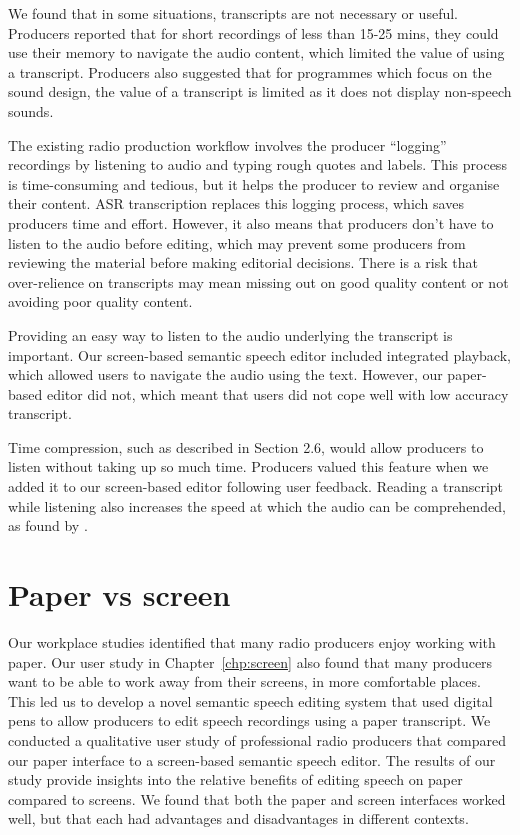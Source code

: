 We found that in some situations, transcripts are not necessary or useful. Producers reported that for short recordings
of less than 15-25 mins, they could use their memory to navigate the audio content, which limited the value of using a
transcript. Producers also suggested that for programmes which focus on the sound design, the value of a transcript is
limited as it does not display non-speech sounds.

The existing radio production workflow involves the producer ``logging'' recordings by listening to audio and typing
rough quotes and labels.  This process is time-consuming and tedious, but it helps the producer to review and organise
their content.  ASR transcription replaces this logging process, which saves producers time and effort. However, it
also means that producers don't have to listen to the audio before editing, which may prevent some producers from
reviewing the material before making editorial decisions.  There is a risk that over-relience on transcripts may mean
missing out on good quality content or not avoiding poor quality content.


Providing an easy way to listen to the audio underlying the transcript is important. Our screen-based semantic speech
editor included integrated playback, which allowed users to navigate the audio using the text. However, our paper-based
editor did not, which meant that users did not cope well with low accuracy transcript.

Time compression, such as described in Section 2.6, would allow producers to listen without taking up so much time.
Producers valued this feature when we added it to our screen-based editor following user feedback. Reading a transcript
while listening also increases the speed at which the audio can be comprehended, as found by \citet{Vemuri2004}.

\section{Paper vs screen}

Our workplace studies identified that many radio producers enjoy working with paper.  Our user study in
Chapter~\ref{chp:screen} also found that many producers want to be able to work away from their screens, in more
comfortable places.  This led us to develop a novel semantic speech editing system that used digital pens to allow
producers to edit speech recordings using a paper transcript.  We conducted a qualitative user study of professional
radio producers that compared our paper interface to a screen-based semantic speech editor. The results of our study
provide insights into the relative benefits of editing speech on paper compared to screens. We found that both the
paper and screen interfaces worked well, but that each had advantages and disadvantages in different contexts.

